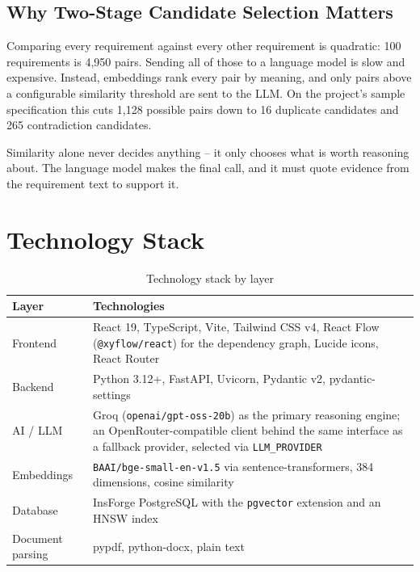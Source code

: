 \documentclass[11pt,a4paper]{article}
\begin{document}
\subsection{Why Two-Stage Candidate Selection Matters}

Comparing every requirement against every other requirement is quadratic:
100 requirements is 4{,}950 pairs. Sending all of those to a language model
is slow and expensive. Instead, embeddings rank every pair by meaning, and
only pairs above a configurable similarity threshold are sent to the LLM.
On the project's sample specification this cuts 1{,}128 possible pairs down
to 16 duplicate candidates and 265 contradiction candidates.

Similarity alone never decides anything -- it only chooses what is worth
reasoning about. The language model makes the final call, and it must quote
evidence from the requirement text to support it.

\section{Technology Stack}

\begin{table}[h!]
\centering
\begin{tabular}{p{3.0cm} p{10.4cm}}
\toprule
\textbf{Layer} & \textbf{Technologies} \\
\midrule
Frontend & React 19, TypeScript, Vite, Tailwind CSS v4, React Flow
  (\texttt{@xyflow/react}) for the dependency graph, Lucide icons, React
  Router \\
Backend & Python 3.12+, FastAPI, Uvicorn, Pydantic v2, pydantic-settings \\
AI / LLM & Groq (\texttt{openai/gpt-oss-20b}) as the primary reasoning
  engine; an OpenRouter-compatible client behind the same interface as a
  fallback provider, selected via \texttt{LLM\_PROVIDER} \\
Embeddings & \texttt{BAAI/bge-small-en-v1.5} via sentence-transformers,
  384 dimensions, cosine similarity \\
Database & InsForge PostgreSQL with the \texttt{pgvector} extension and an
  HNSW index \\
Document parsing & pypdf, python-docx, plain text \\
\bottomrule
\end{tabular}
\caption{Technology stack by layer}
\end{table}
\end{document}
